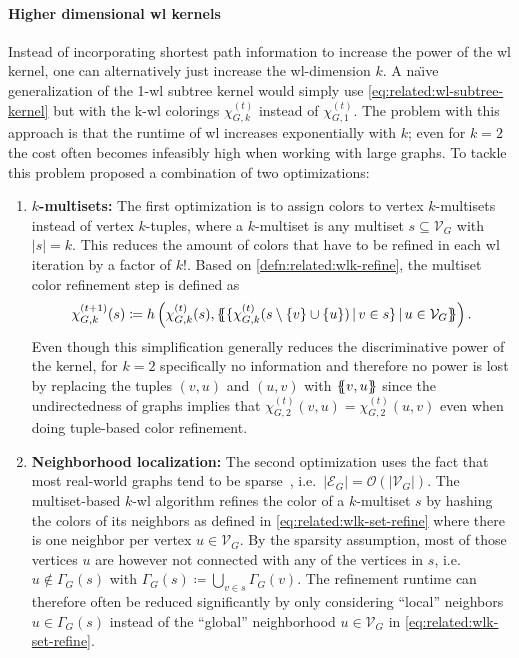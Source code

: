 \paragraph{Higher dimensional \ac{wl} kernels}
Instead of incorporating shortest path information to increase the power of the \ac{wl} kernel, one can alternatively just increase the \acs{wl}-dimension $k$.
A na{\"\i}ve generalization of the 1-\acs{wl} subtree kernel would simply use \cref{eq:related:wl-subtree-kernel} but with the k-\acs{wl} colorings $\chi_{G,k}^{(t)}$ instead of $\chi_{G,1}^{(t)}$.
The problem with this approach is that the runtime of \ac{wl} increases exponentially with $k$;
even for $k = 2$ the cost often becomes infeasibly high when working with large graphs.
To tackle this problem \citet{Morris2017} proposed a combination of two optimizations:
\begin{enumerate}[label=\textbf{\arabic*.}]
	\item \textbf{$k$-multisets:}
		The first optimization is to assign colors to vertex $k$-multisets instead of vertex $k$-tuples, where a $k$-multiset is any multiset $s \subseteq \mathcal{V}_G$ with ${|s|} = k$.
		This reduces the amount of colors that have to be refined in each \ac{wl} iteration by a factor of $k!$. %
		Based on \cref{defn:related:wlk-refine}, the multiset color refinement step is defined as
		\begin{align}
			\chi_{G,k}^{(t+1)}(s) \coloneqq h\left(\chi_{G,k}^{(t)}(s), \ldblbrace \{ \chi_{G,k}^{(t)}(s \setminus \{v\} \cup \{u\})\, |\, v \in s \}\, |\, u \in \mathcal{V}_G \rdblbrace\right) \text{.} \label{eq:related:wlk-set-refine} %
		\end{align}
		Even though this simplification generally reduces the discriminative power of the kernel, for $k = 2$ specifically no information and therefore no power is lost by replacing the tuples $(v, u)$ and $(u, v)$ with $\ldblbrace v, u \rdblbrace$ since the undirectedness of graphs implies that $\chi_{G,2}^{(t)}(v, u) = \chi_{G,2}^{(t)}(u, v)$ even when doing tuple-based color refinement.
	\item \textbf{Neighborhood localization:}
		The second optimization uses the fact that most real-world graphs tend to be sparse~\cite{Chung2010}, i.e.\ ${|\mathcal{E}_G|} = \mathcal{O}(|\mathcal{V}_G|)$.
		The multiset-based $k$-\acs{wl} algorithm refines the color of a $k$-multiset $s$ by hashing the colors of its neighbors as defined in \cref{eq:related:wlk-set-refine} where there is one neighbor per vertex $u \in \mathcal{V}_G$.
		By the sparsity assumption, most of those vertices $u$ are however not connected with any of the vertices in $s$, i.e.\ $u \notin \Gamma_G(s)$ with $\Gamma_G(s) \coloneqq \bigcup_{v \in s} \Gamma_G(v)$.
		The refinement runtime can therefore often be reduced significantly by only considering ``local'' neighbors $u \in \Gamma_G(s)$ instead of the ``global'' neighborhood $u \in \mathcal{V}_G$ in \cref{eq:related:wlk-set-refine}.
\end{enumerate}
